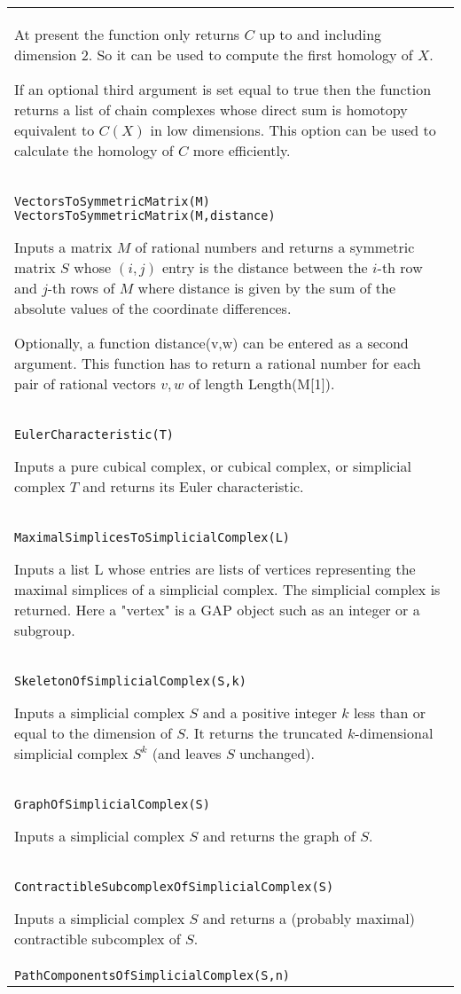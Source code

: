 \documentclass[a4paper,11pt]{report}
\begin{document}
{\begin{center}
\begin{tabular}{|l|}
 At present the function only returns $C$ up to and including dimension 2. So it can be used to compute the first
homology of $X$. 

 If an optional third argument is set equal to true then the function returns a
list of chain complexes whose direct sum is homotopy equivalent to $C(X)$ in low dimensions. This option can be used to calculate the homology of $C$ more efficiently. \\
 \index{VectorsToSymmetricMatrix} \texttt{VectorsToSymmetricMatrix(M)} \texttt{VectorsToSymmetricMatrix(M,distance)} 

 Inputs a matrix $M$ of rational numbers and returns a symmetric matrix $S$ whose $(i,j)$ entry is the distance between the $i$-th row and $j$-th rows of $M$ where distance is given by the sum of the absolute values of the coordinate
differences. 

 Optionally, a function distance(v,w) can be entered as a second argument. This
function has to return a rational number for each pair of rational vectors $v,w$ of length Length(M[1]). \\
 \index{EulerCharacteristic} \texttt{EulerCharacteristic(T)} 

 Inputs a pure cubical complex, or cubical complex, or simplicial complex $T$ and returns its Euler characteristic. \\
 \index{MaximalSimplicesToSimplicialComplex} \texttt{MaximalSimplicesToSimplicialComplex(L)} 

 Inputs a list L whose entries are lists of vertices representing the maximal
simplices of a simplicial complex. The simplicial complex is returned. Here a
"vertex" is a GAP object such as an integer or a subgroup. \\
 \index{SkeletonOfSimplicialComplex} \texttt{SkeletonOfSimplicialComplex(S,k)} 

 Inputs a simplicial complex $S$ and a positive integer $k$ less than or equal to the dimension of $S$. It returns the truncated $k$-dimensional simplicial complex $S^k$ (and leaves $S$ unchanged). \\
 \index{GraphOfSimplicialComplex} \texttt{GraphOfSimplicialComplex(S)} 

 Inputs a simplicial complex $S$ and returns the graph of $S$. \\
 \index{ContractibleSubcomplexOfSimplicialComplex} \texttt{ContractibleSubcomplexOfSimplicialComplex(S)} 

 Inputs a simplicial complex $S$ and returns a (probably maximal) contractible subcomplex of $S$. \\
 \index{PathComponentsOfSimplicialComplex} \texttt{PathComponentsOfSimplicialComplex(S,n)} 


\end{tabular}
\end{center}}
\end{document}
